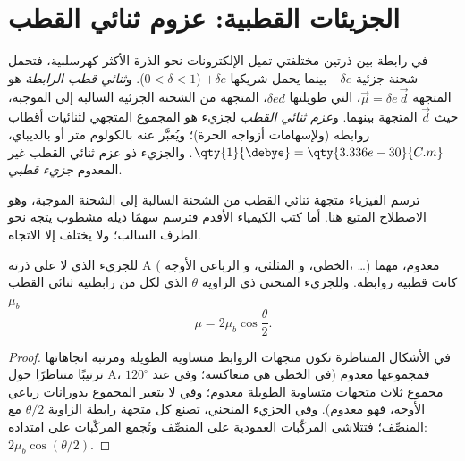 \section{الجزيئات القطبية: عزوم ثنائي القطب}

\begin{definition}\label{def:b1:lewis-resonance-vsepr:dipole}
في رابطة بين ذرتين مختلفتي  تميل الإلكترونات
نحو الذرة الأكثر كهرسلبية، فتحمل شحنة جزئية
$-\delta e$ بينما يحمل شريكها $+\delta e$ ($0 < \delta < 1$).
و\emph{ثنائي قطب الرابطة} هو المتجهة $\vec\mu = \delta e\,
\vec d$، التي طويلتها $\delta e d$، المتجهة من الشحنة الجزئية السالبة إلى الموجبة،
حيث $\vec d$ المتجهة بينهما.
و\emph{عزم ثنائي القطب} لجزيء هو المجموع المتجهي
لثنائيات أقطاب روابطه (ولإسهامات أزواجه الحرة)؛ ويُعبَّر عنه
بالكولوم متر أو بالديباي، $\qty{1}{\debye} =
\qty{3.336e-30}{C.m}$. والجزيء ذو عزم ثنائي القطب غير المعدوم
\emph{جزيء قطبي}.
\end{definition}

\begin{remark}\label{rem:b1:lewis-resonance-vsepr:convention}
ترسم الفيزياء متجهة ثنائي القطب من الشحنة السالبة إلى الشحنة
الموجبة، وهو الاصطلاح المتبع هنا. أما كتب الكيمياء الأقدم فترسم سهمًا
ذيله مشطوب يتجه نحو الطرف السالب؛ ولا يختلف إلا
الاتجاه.
\end{remark}

\begin{proposition}\label{prop:b1:lewis-resonance-vsepr:dipole-sum}
للجزيء  الذي لا  على ذرته A ( الخطي،
و المثلثي، و الرباعي الأوجه، \dots)  معدوم، مهما
كانت قطبية روابطه. وللجزيء  المنحني ذي الزاوية $\theta$
الذي لكل من رابطتيه ثنائي القطب $\mu_b$ 
\[
  \mu = 2\mu_b \cos\frac{\theta}{2} .
\]
\end{proposition}

\begin{proof}
في الأشكال المتناظرة تكون متجهات الروابط متساوية الطويلة
ومرتبة اتجاهاتها ترتيبًا متناظرًا حول A، فمجموعها معدوم
(في  الخطي هي متعاكسة؛ وفي  عند $120^\circ$
مجموع ثلاث متجهات متساوية الطويلة معدوم؛ وفي  لا يتغير المجموع
بدورانات رباعي الأوجه، فهو معدوم). وفي
الجزيء المنحني، تصنع كل متجهة رابطة الزاوية $\theta/2$ مع
المنصِّف؛ فتتلاشى المركّبات العمودية على المنصِّف وتُجمع
المركّبات على امتداده: $2\mu_b\cos(\theta/2)$.
\end{proof}

